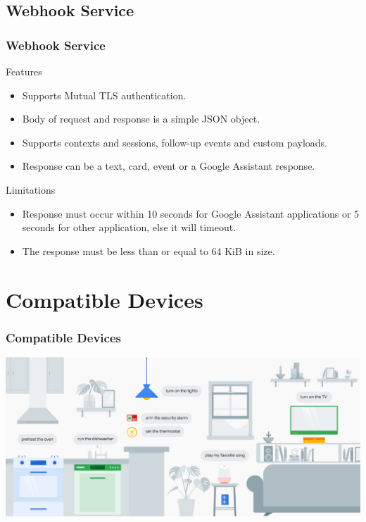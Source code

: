 \documentclass{beamer}
\begin{document}

\subsection{Webhook Service}

\begin{frame}
\frametitle{Webhook Service}
\begin{block}{Features}
\begin{itemize}
\item Supports Mutual TLS authentication.
\item Body of request and response is a simple JSON object.
\item Supports contexts and sessions, follow-up events and custom payloads.
\item Response can be a text, card, event or a Google Assistant response.
\end{itemize}
\end{block}


\begin{block}{Limitations}
\begin{itemize}
\item Response must occur within 10 seconds for Google Assistant applications or 5 seconds for other application, else it will timeout. 
\item The response must be less than or equal to 64 KiB in size.
\end{itemize}
\end{block}

\end{frame}


\section{Compatible Devices}

\begin{frame}
\frametitle{Compatible Devices}
\begin{center}
\includegraphics[scale=0.30]{pictures/smart_home.png} 
\end{center}
\end{frame}
\end{document}
